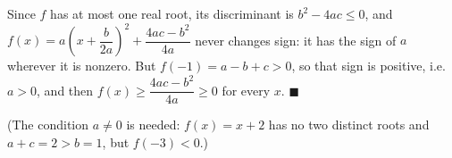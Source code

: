 Since $f$ has at most one real root, its discriminant is $b^2-4ac\le0$, and $f(x)=a\left(x+\dfrac{b}{2a}\right)^2+\dfrac{4ac-b^2}{4a}$ never changes sign: it has the sign of $a$ wherever it is nonzero. But $f(-1)=a-b+c>0$, so that sign is positive, i.e. $a>0$, and then $f(x)\ge\dfrac{4ac-b^2}{4a}\ge0$ for every $x$. $\blacksquare$

(The condition $a\ne0$ is needed: $f(x)=x+2$ has no two distinct roots and $a+c=2>b=1$, but $f(-3)<0$.)
